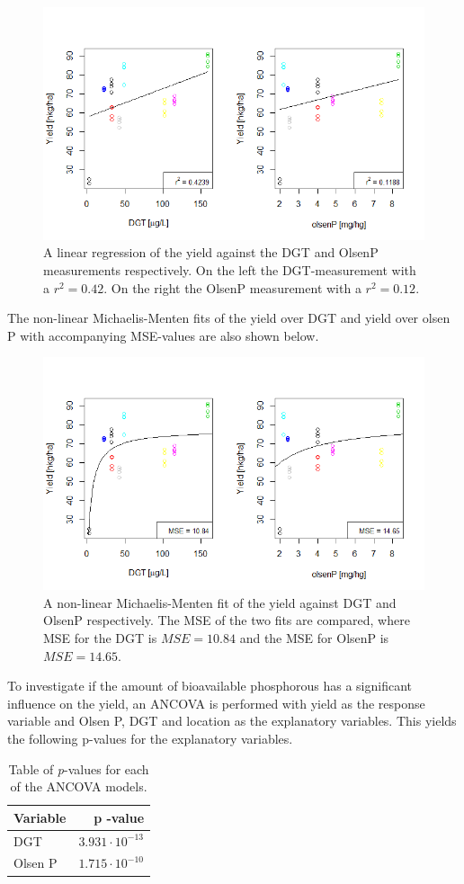 \documentclass[11pt, fleqn, titlepage]{article}
\begin{document}
\begin{figure}[H]
	\centering
	\includegraphics[width=0.6\linewidth]{billeder/Linearfit.png}
	\caption{A linear regression of the yield against the DGT and OlsenP measurements respectively. On the left the DGT-measurement with a $ r^2 = 0.42 $. On the right the OlsenP measurement with a $ r^2 = 0.12 $.}
	\label{fig:linearfit}
\end{figure}

\noindent The non-linear Michaelis-Menten fits of the yield over DGT and yield over olsen P with accompanying MSE-values are also shown below.

\begin{figure}[H]
	\centering
	\includegraphics[width=0.6\linewidth]{billeder/non-linearfit.png}
	\caption{A non-linear Michaelis-Menten fit of the yield against DGT and OlsenP respectively. The MSE of the two fits are compared, where MSE for the DGT is $ MSE = 10.84 $ and the MSE for OlsenP is $ MSE = 14.65 $.}
	\label{fig:non-linearfit}
\end{figure}

\noindent To investigate if the amount of bioavailable phosphorous has a significant influence on the yield, an ANCOVA is performed with yield as the response variable and Olsen P, DGT and location as the explanatory variables. This yields the following p-values for the explanatory variables.

\begin{table}[H]
	\centering
	\begin{tabular}{l r}
		\toprule
		Variable     & p -value                       \\ \midrule
		DGT          & $3.931 \cdot 10^{-13}$       \\ 
		Olsen P      & $1.715 \cdot 10^{-10}$        \\ \bottomrule 
	\end{tabular}
	\caption{Table of \textit{p}-values for each of the ANCOVA models.}
	\label{tabel}
\end{table}
\end{document}

